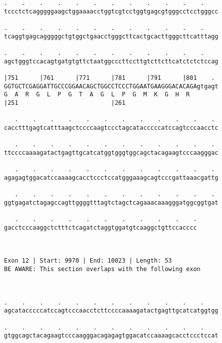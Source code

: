 \documentclass{article}
\begin{document}
\begin{Verbatim}
.    .    .    .    .    .    .    .    .    .    .    .    
tccctctcagggggaagctggaaaacctggtcgtcctggtgagcgtgggcctcctgggcc
                                                            
.    .    .    .    .    .    .    .    .    .    .    .    
tcaggtgagcagggggctgtggctgaacctgggcttcactgcacttgggcttcatttagg
                                                            
.    .    .    .    .    .    .    .    .    .    .    .    
agctgggtccacagtgatgtgttctaatggcccttccttgtcttcttcatctctctccag
                                                            
|751      |761      |771      |781      |791      |801    . 
GGTGCTCGAGGATTGCCCGGAACAGCTGGCCTCCCTGGAATGAAGGGACACAGAgtgagt
G  A  R  G  L  P  G  T  A  G  L  P  G  M  K  G  H  R        
|251                          |261                          
  
   .    .    .    .    .    .    .    .    .    .    .    . 
cacctttgagtcatttaagctccccaagtccctagcatacccccatccagtcccaacctc
                                                            
   .    .    .    .    .    .    .    .    .    .    .    . 
ttccccaaaagatactgagttgcatcatggtgggtggcagctacagaagtcccaagggac
                                                            
   .    .    .    .    .    .    .    .    .    .    .    . 
agagagtggacatccaaaagcacctccctccatgggaaagcagtcccgattaaacgattg
                                                            
   .    .    .    .    .    .    .    .    .    .    .    . 
ggtgagatctagagccagttggggtttagtctagctcagaaacaaagggatggcggtgat
                                                            
   .    .    .    .    .    .    .    .    .    .    .
gacctcccaaggctctttctcagatctaggtggatgtcaaggctgttccacccc
                                                      
                                                      
 
Exon 12 | Start: 9970 | End: 10023 | Length: 53
BE AWARE: This section overlaps with the following exon



.    .    .    .    .    .    .    .    .    .    .    .    
agcatacccccatccagtcccaacctcttccccaaaagatactgagttgcatcatggtgg
                                                            
.    .    .    .    .    .    .    .    .    .    .    .    
gtggcagctacagaagtcccaagggacagagagtggacatccaaaagcacctccctccat
                                                            

\end{Verbatim}
\end{document}
